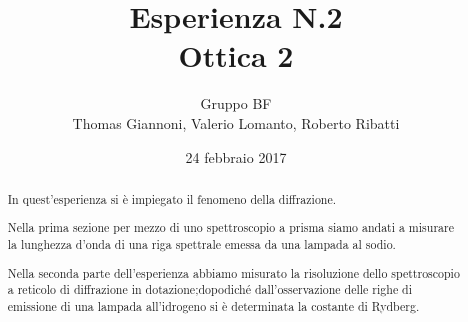 \documentclass[11pt,a4paper]{article}
\author{Gruppo BF \\ \smallskip Thomas Giannoni, Valerio Lomanto, Roberto Ribatti}
\title{Esperienza N.2 \\ \smallskip Ottica 2}
\date{24 febbraio 2017}
\begin{document}
\maketitle

\begin{abstract}
In quest'esperienza si è impiegato il fenomeno della diffrazione.

Nella prima sezione per mezzo di uno 
spettroscopio a prisma 
siamo andati a misurare la 
lunghezza d'onda di una riga spettrale
emessa da una lampada al sodio.

Nella seconda parte dell'esperienza abbiamo misurato 
la risoluzione dello spettroscopio a reticolo di diffrazione
in dotazione;dopodiché dall'osservazione delle righe di 
emissione di una lampada all'idrogeno 
si è determinata la costante di Rydberg.

\end{abstract}

\tableofcontents %







%
\end{document}
